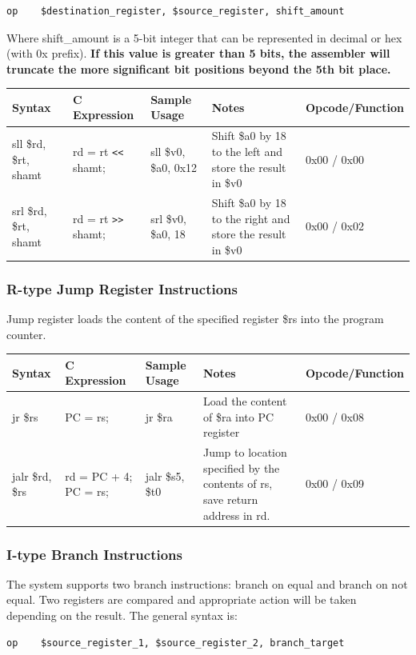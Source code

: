 \documentclass{article}
\begin{document}
\begin{verbatim}
op    $destination_register, $source_register, shift_amount
\end{verbatim}

Where shift\_amount is a 5-bit integer that can be represented in decimal or hex (with 0x prefix). \textbf{If this value is greater than 5 bits, the assembler will truncate the more significant bit positions beyond the 5th bit place. }

\begin{tabularx}{\linewidth}{|X|X|X|X|X|}
\hline
Syntax & C Expression & Sample Usage & Notes & Opcode/Function \\
\hline
sll \$rd, \$rt, shamt & rd = rt \verb+<<+ shamt; & sll \$v0, \$a0, 0x12 & Shift \$a0 by 18 to the left and store the result in \$v0 & 0x00 / 0x00 \\
srl \$rd, \$rt, shamt & rd = rt \verb+>>+ shamt; & srl \$v0, \$a0, 18 & Shift \$a0 by 18 to the right and store the result in \$v0 & 0x00 / 0x02 \\
\hline
\end{tabularx}
\subsubsection{R-type Jump Register Instructions}
Jump register loads the content of the specified register \$rs into the program counter. 

\begin{tabularx}{\linewidth}{|X|X|X|X|X|}
\hline
Syntax & C Expression & Sample Usage & Notes & Opcode/Function \\
\hline
jr \$rs & PC = rs; & jr \$ra & Load the content of \$ra into PC register & 0x00 / 0x08 \\
jalr \$rd, \$rs & rd = PC + 4; PC = rs; & jalr \$s5, \$t0 & Jump to location specified by the contents of rs, save return address in rd. & 0x00 / 0x09 \\
\hline
\end{tabularx}

\subsubsection{I-type Branch Instructions}
The system supports two branch instructions: branch on equal and branch on not equal. Two registers are compared and appropriate action will be taken depending on the result. The general syntax is: 

\begin{verbatim}
op    $source_register_1, $source_register_2, branch_target
\end{verbatim}
\end{document}
